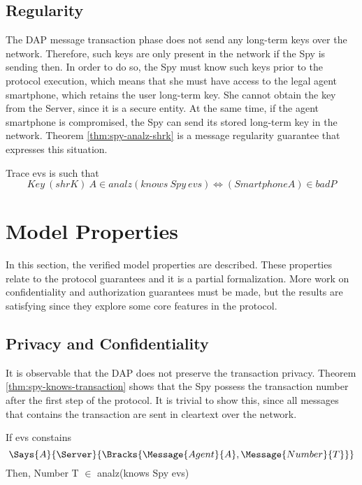 \subsection{Regularity}
The DAP message transaction phase does not send any long-term keys over the network. Therefore, such keys are only present in the network if the Spy is sending then. In order to do so, the Spy must know such keys prior to the protocol execution, which means that she must have access to the legal agent smartphone, which retains the user long-term key. She cannot obtain the key from the Server, since it is a secure entity. At the same time, if the agent smartphone is compromised, the Spy can send its stored long-term key in the network. Theorem \ref{thm:spy-analz-shrk} is a message regularity guarantee that expresses this situation.

\begin{theorem}
\label{thm:spy-analz-shrk}
  Trace evs is such that \[Key\ (shrK)\ A \in analz(knows\ Spy\ evs) \Longleftrightarrow (Smartphone A) \in badP\]
\end{theorem}


\section{Model Properties}
In this section, the verified model properties are described. These properties relate to the protocol guarantees and it is a partial formalization. More work on confidentiality and authorization guarantees must be made, but the results are satisfying since they explore some core features in the protocol.



\subsection{Privacy and Confidentiality}
It is observable that the DAP does not preserve the transaction privacy. Theorem \ref{thm:spy-knows-transaction} shows that the Spy possess the transaction number after the first step of the protocol. It is trivial to show this, since all messages that contains the transaction are sent in cleartext over the network.

\begin{theorem}
  \label{thm:spy-knows-transaction}
  If evs constains
  \[\Says{A}{\Server}{\Bracks{\Message{Agent}{A}, \Message{Number}{T}}}\]
  Then, Number T $\in$ analz(knows Spy evs)
\end{theorem}

